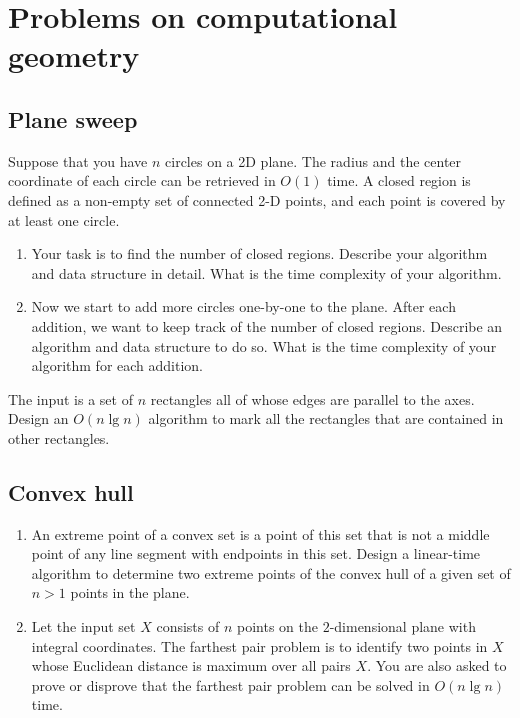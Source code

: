 \chapter{Problems on computational geometry}

\section{Plane sweep}
\begin{Exercise}
Suppose that you have $n$ circles on a 2D plane. The radius and the center coordinate of each circle can be retrieved in $O(1)$ time. A closed region is defined as a non-empty set of connected 2-D points, and each point is covered by at least one circle.
\begin{enumerate}
\item Your task is to find the number of closed regions. Describe your algorithm and data structure in detail. What is the time complexity of your algorithm.
\item Now we start to add more circles one-by-one to the plane. After each addition, we want to keep track of the number of closed regions. Describe an algorithm and data structure to do so. What is the time complexity of your algorithm for each addition. 
\end{enumerate}
\end{Exercise}
\begin{Answer}
\end{Answer}

\begin{Exercise}
The input is a set of $n$ rectangles all of whose edges are parallel to the axes. Design an $O(n \lg n)$ algorithm to mark all the rectangles that are contained in other rectangles. 
\end{Exercise}
\begin{Answer}
\end{Answer}


\section{Convex hull}

\begin{Exercise}
\begin{enumerate}
\item An extreme point of a convex set is a point of this set that is not a middle point of any line segment with endpoints in this set. Design a linear-time algorithm to determine two extreme points of the convex hull of a given set of $n > 1$ points in the plane. 
\item Let the input set $X$ consists of $n$ points on the $2$-dimensional plane with integral coordinates. The farthest pair problem is to identify two points in $X$ whose Euclidean distance is maximum over all pairs $X$. You are also asked to prove or disprove that the farthest pair problem can be solved in $O(n \lg n)$ time. 
\end{enumerate}
\end{Exercise}
\begin{Answer}
\end{Answer}


